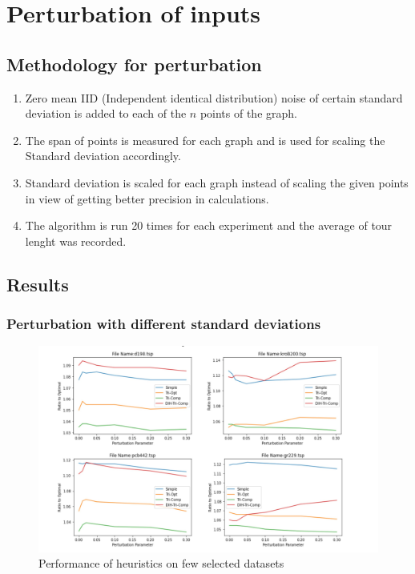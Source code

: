 \chapter{Perturbation of inputs}
\section{Methodology for perturbation}
\begin{enumerate}
    \item {Zero mean IID (Independent identical distribution) noise of certain standard deviation is added to each of the $n$ points of the graph.}
    \item {The span of points is measured for each graph and is used for scaling the Standard deviation accordingly.}
    \item {Standard deviation is scaled for each graph instead of scaling the given points in view of getting better precision in calculations.}
    \item {The algorithm is run 20 times for each experiment and the average of tour lenght was recorded.}
\end{enumerate}
\section{Results}
\subsection{Perturbation with different standard deviations}
\begin{figure}[H]
    \centering
    \includegraphics[scale=0.26]{7.jpg}
    \caption{Performance of heuristics on few selected datasets}
\end{figure}

